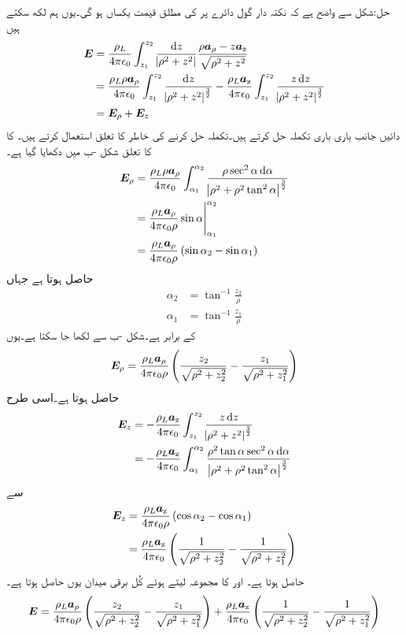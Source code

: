 حل:شکل  سے واضح ہے کہ نکتہ دار گول دائرے پر  کی مطلق قیمت  یکساں ہو گی۔یوں ہم لکھ سکتے ہیں
\begin{align*}
\kvec{E}&=\frac{\rho_L}{4\pi\epsilon_0} \int_{z_1}^{z_2} \frac{\dif z}{\abs{\rho^2+z^2}} \frac{\rho\arho-z\az}{\sqrt{\rho^2+z^2}}\\
&=\frac{\rho_L \rho\arho}{4\pi\epsilon_0} \int_{z_1}^{z_2} \frac{\dif z}{\abs{\rho^2+z^2}^{\frac{3}{2}}}-\frac{\rho_L \az}{4\pi\epsilon_0} \int_{z_1}^{z_2} \frac{z\dif z}{\abs{\rho^2+z^2}^{\frac{3}{2}}}\\
&=\kvec{E}_\rho +\kvec{E}_z
\end{align*}
دائیں جانب باری باری تکملہ حل کرتے ہیں۔تکملہ حل کرنے کی خاطر  کا تعلق استعمال کرتے ہیں۔ کا  کا تعلق شکل -ب میں دکھایا گیا ہے۔
\begin{align*}
\kvec{E}_\rho&=\frac{\rho_L \rho\arho}{4\pi\epsilon_0} \int_{\alpha_1}^{\alpha_2} \frac{\rho \sec^2 \alpha\dif \alpha}{\abs{\rho^2+\rho^2 \tan^2 \alpha}^{\frac{3}{2}}}\\
&=\frac{\rho_L \arho}{4\pi\epsilon_0 \rho} \eval{\sin \alpha}_{\alpha_1}^{\alpha_2}\\
&=\frac{\rho_L \arho}{4\pi\epsilon_0 \rho} \left(\sin \alpha_2-\sin \alpha_1 \right)
\end{align*}
حاصل ہوتا ہے جہاں
\begin{align*}
\alpha_2&=\tan^{-1} \frac{z_2}{\rho}\\
\alpha_1&=\tan^{-1} \frac{z_1}{\rho}
\end{align*}
کے برابر ہے۔شکل  -ب سے  لکھا جا سکتا ہے۔یوں
\begin{align*}
{\ensuremath{{\boldsymbol{E}}}}_{\rho}=\frac{\rho_L {\boldsymbol{a}}_{\rho}}{4\pi\epsilon_0 \rho} \left(\frac{z_2}{\sqrt{\rho^2+z_2^2}}-\frac{z_1}{\sqrt{\rho^2+z_1^2}}\right)
\end{align*}
حاصل ہوتا ہے۔اسی طرح
\begin{align*}
\kvec{E}_z&=-\frac{\rho_L \az}{4\pi\epsilon_0} \int_{z_1}^{z_2} \frac{z\dif z}{\abs{\rho^2+z^2}^{\frac{3}{2}}}\\
&=-\frac{\rho_L \az}{4\pi\epsilon_0} \int_{\alpha_1}^{\alpha_2} \frac{\rho^2 \tan \alpha \sec^2 \alpha \dif \alpha}{\abs{\rho^2+\rho^2 \tan^2 \alpha}^{\frac{3}{2}}}
\end{align*}
سے
\begin{align*}
{\ensuremath{{\boldsymbol{E}}}}_z&=\frac{\rho_L {\boldsymbol{a}}_{\textup{z}}}{4\pi\epsilon_0 \rho} \left(\cos \alpha_2 -\cos \alpha_1 \right)\\
&=\frac{\rho_L {\boldsymbol{a}}_{\textup{z}}}{4\pi\epsilon_0 } \left(\frac{1}{\sqrt{\rho^2+z_2^2}}-\frac{1}{\sqrt{\rho^2+z_1^2}} \right)
\end{align*}
حاصل ہوتا ہے۔ اور  کا مجموعہ لیتے ہوئے کُل برقی میدان یوں حاصل ہوتا ہے۔
\begin{align}
{\ensuremath{{\boldsymbol{E}}}}=\frac{\rho_L {\boldsymbol{a}}_{\rho}}{4\pi\epsilon_0 \rho} \left(\frac{z_2}{\sqrt{\rho^2+z_2^2}}-\frac{z_1}{\sqrt{\rho^2+z_1^2}}\right)+\frac{\rho_L {\boldsymbol{a}}_{\textup{z}}}{4\pi\epsilon_0 } \left(\frac{1}{\sqrt{\rho^2+z_2^2}}-\frac{1}{\sqrt{\rho^2+z_1^2}} \right)
\end{align}

